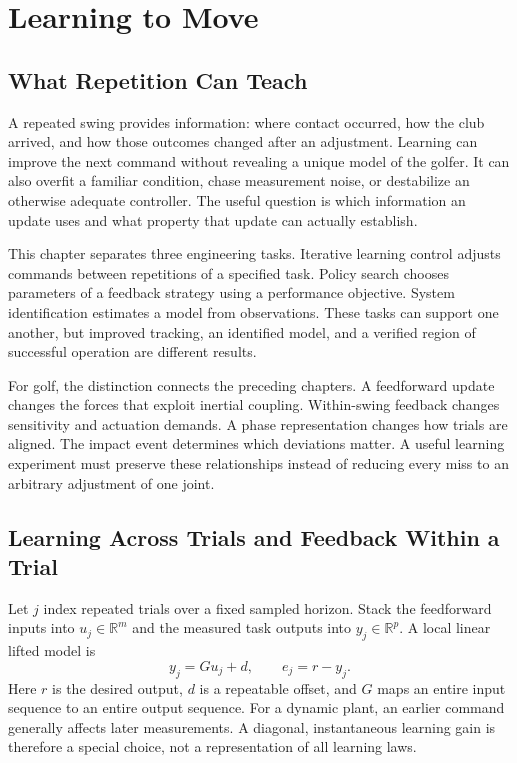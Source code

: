 \chapter{Learning to Move}
\label{ch:learning_to_move}
\begingroup
\raggedbottom

\section{What Repetition Can Teach}

A repeated swing provides information: where contact occurred, how the club arrived, and how those outcomes changed after an adjustment. Learning can improve the next command without revealing a unique model of the golfer. It can also overfit a familiar condition, chase measurement noise, or destabilize an otherwise adequate controller. The useful question is which information an update uses and what property that update can actually establish.

This chapter separates three engineering tasks. Iterative learning control adjusts commands between repetitions of a specified task. Policy search chooses parameters of a feedback strategy using a performance objective. System identification estimates a model from observations. These tasks can support one another, but improved tracking, an identified model, and a verified region of successful operation are different results.

For golf, the distinction connects the preceding chapters. A feedforward update changes the forces that exploit inertial coupling. Within-swing feedback changes sensitivity and actuation demands. A phase representation changes how trials are aligned. The impact event determines which deviations matter. A useful learning experiment must preserve these relationships instead of reducing every miss to an arbitrary adjustment of one joint.

\section{Learning Across Trials and Feedback Within a Trial}

Let $j$ index repeated trials over a fixed sampled horizon. Stack the feedforward inputs into $u_j\in\mathbb R^m$ and the measured task outputs into $y_j\in\mathbb R^p$. A local linear lifted model is
\begin{equation}
y_j=G u_j+d,\qquad e_j=r-y_j .
\end{equation}
Here $r$ is the desired output, $d$ is a repeatable offset, and $G$ maps an entire input sequence to an entire output sequence. For a dynamic plant, an earlier command generally affects later measurements. A diagonal, instantaneous learning gain is therefore a special choice, not a representation of all learning laws.

